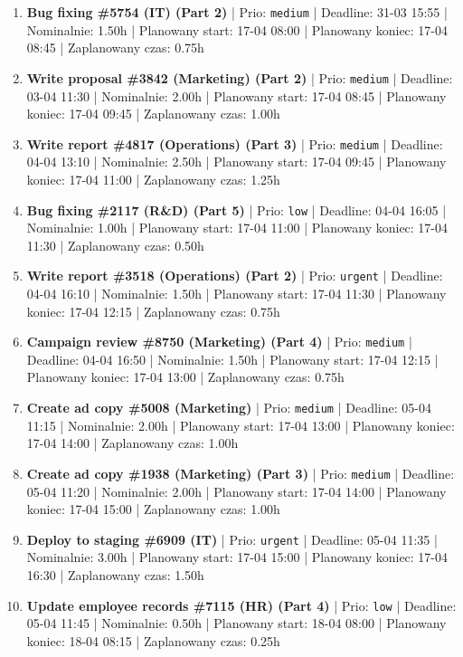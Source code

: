 {\begin{enumerate}
  \item [\textbf{14631}] \textbf{Bug fixing \#5754 (IT) (Part 2)} | Prio: \texttt{medium} | Deadline: 31-03 15:55 | Nominalnie: 1.50h | Planowany start: 17-04 08:00 | Planowany koniec: 17-04 08:45 | Zaplanowany czas: 0.75h
  \item [\textbf{14673}] \textbf{Write proposal \#3842 (Marketing) (Part 2)} | Prio: \texttt{medium} | Deadline: 03-04 11:30 | Nominalnie: 2.00h | Planowany start: 17-04 08:45 | Planowany koniec: 17-04 09:45 | Zaplanowany czas: 1.00h
  \item [\textbf{14639}] \textbf{Write report \#4817 (Operations) (Part 3)} | Prio: \texttt{medium} | Deadline: 04-04 13:10 | Nominalnie: 2.50h | Planowany start: 17-04 09:45 | Planowany koniec: 17-04 11:00 | Zaplanowany czas: 1.25h
  \item [\textbf{14689}] \textbf{Bug fixing \#2117 (R\&D) (Part 5)} | Prio: \texttt{low} | Deadline: 04-04 16:05 | Nominalnie: 1.00h | Planowany start: 17-04 11:00 | Planowany koniec: 17-04 11:30 | Zaplanowany czas: 0.50h
  \item [\textbf{14598}] \textbf{Write report \#3518 (Operations) (Part 2)} | Prio: \texttt{urgent} | Deadline: 04-04 16:10 | Nominalnie: 1.50h | Planowany start: 17-04 11:30 | Planowany koniec: 17-04 12:15 | Zaplanowany czas: 0.75h
  \item [\textbf{14632}] \textbf{Campaign review \#8750 (Marketing) (Part 4)} | Prio: \texttt{medium} | Deadline: 04-04 16:50 | Nominalnie: 1.50h | Planowany start: 17-04 12:15 | Planowany koniec: 17-04 13:00 | Zaplanowany czas: 0.75h
  \item [\textbf{14666}] \textbf{Create ad copy \#5008 (Marketing)} | Prio: \texttt{medium} | Deadline: 05-04 11:15 | Nominalnie: 2.00h | Planowany start: 17-04 13:00 | Planowany koniec: 17-04 14:00 | Zaplanowany czas: 1.00h
  \item [\textbf{14652}] \textbf{Create ad copy \#1938 (Marketing) (Part 3)} | Prio: \texttt{medium} | Deadline: 05-04 11:20 | Nominalnie: 2.00h | Planowany start: 17-04 14:00 | Planowany koniec: 17-04 15:00 | Zaplanowany czas: 1.00h
  \item [\textbf{14597}] \textbf{Deploy to staging \#6909 (IT)} | Prio: \texttt{urgent} | Deadline: 05-04 11:35 | Nominalnie: 3.00h | Planowany start: 17-04 15:00 | Planowany koniec: 17-04 16:30 | Zaplanowany czas: 1.50h
  \item [\textbf{14701}] \textbf{Update employee records \#7115 (HR) (Part 4)} | Prio: \texttt{low} | Deadline: 05-04 11:45 | Nominalnie: 0.50h | Planowany start: 18-04 08:00 | Planowany koniec: 18-04 08:15 | Zaplanowany czas: 0.25h

\end{enumerate}}
